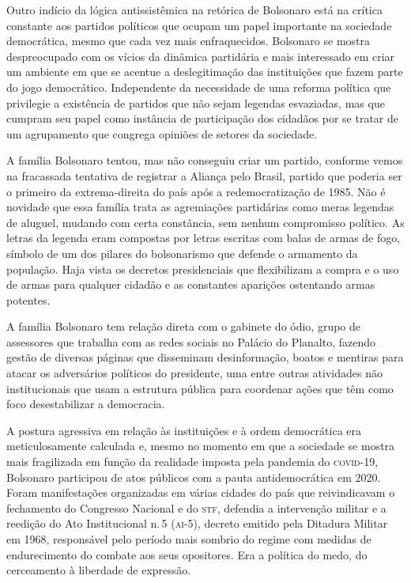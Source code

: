 Outro indício da lógica antissistêmica na retórica de Bolsonaro está na
crítica constante aos partidos políticos que ocupam um papel importante
na sociedade democrática, mesmo que cada vez mais enfraquecidos.
Bolsonaro se mostra despreocupado com os vícios da dinâmica partidária e
mais interessado em criar um ambiente em que se acentue a deslegitimação
das instituições que fazem parte do jogo democrático. Independente da
necessidade de uma reforma política que privilegie a existência de
partidos que não sejam legendas esvaziadas, mas que cumpram seu papel
como instância de participação dos cidadãos por se tratar de um
agrupamento que congrega opiniões de setores da sociedade.

A família Bolsonaro tentou, mas não conseguiu criar um partido, conforme
vemos na fracassada tentativa de registrar a Aliança pelo Brasil,
partido que poderia ser o primeiro da extrema-direita do país após a
redemocratização de 1985. Não é novidade que essa família trata as
agremiações partidárias como meras legendas de aluguel, mudando com
certa constância, sem nenhum compromisso político. As letras da legenda
eram compostas por letras escritas com balas de armas de fogo, símbolo
de um dos pilares do bolsonarismo que defende o armamento da população.
Haja vista os decretos presidenciais que flexibilizam a compra e o uso de
armas para qualquer cidadão e as constantes aparições ostentando armas
potentes.

A família Bolsonaro tem relação direta com o gabinete do ódio, grupo de
assessores que trabalha com as redes sociais no Palácio do Planalto,
fazendo gestão de diversas páginas que disseminam desinformação, boatos
e mentiras para atacar os adversários políticos do presidente, uma entre
outras atividades não institucionais que usam a estrutura pública para
coordenar ações que têm como foco desestabilizar a democracia.

A postura agressiva em relação às instituições e à ordem democrática era
meticulosamente calculada e, mesmo no momento em que a sociedade se
mostra mais fragilizada em função da realidade imposta pela pandemia do
\textsc{covid-19}, Bolsonaro participou de atos públicos com a pauta
antidemocrática em 2020. Foram manifestações organizadas em várias
cidades do país que reivindicavam o fechamento do Congresso Nacional e
do \textsc{stf}, defendia a intervenção militar e a
reedição do Ato Institucional n.\,5 (\textsc{ai-5}), decreto emitido pela Ditadura
Militar em 1968, responsável pelo período mais sombrio do regime com
medidas de endurecimento do combate aos seus opositores. Era a política
do medo, do cerceamento à liberdade de expressão.

